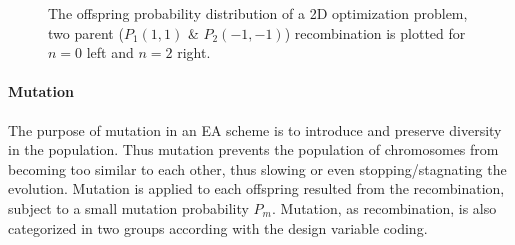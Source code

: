 \begin{itemize}
\begin{figure}[h!]
\begin{minipage}[b]{0.5\linewidth}
 \centering
\end{minipage}
\begin{minipage}[b]{0.5\linewidth}
 \centering
\end{minipage}
\caption{The offspring probability distribution of a 2D optimization problem, two parent ($P_1(1,1)$ \& $P_2(-1,-1)$) recombination is plotted for $n=0$ left and $n=2$ right.}
\label{sbx2}
\end{figure}
\end{itemize}
  
\paragraph{Mutation}
The purpose of mutation in an EA scheme is to introduce and preserve diversity in the population. Thus mutation prevents the population of chromosomes from becoming too similar to each other, thus slowing or even stopping/stagnating the evolution. Mutation is applied to each offspring resulted from the recombination, subject to a small mutation probability $P_m$. Mutation, as recombination, is also categorized in two groups according with the design variable coding.     

